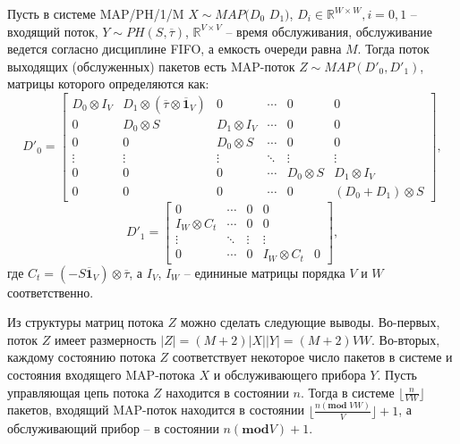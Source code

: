 \begin{thm}\label{th:ch4_map_departure}\textnormal{\cite{VishnevskyDudin2018}}
    Пусть в системе MAP/PH/1/M $X \sim MAP(D_{0}$ $D_{1})$, $D_i \in \mathbb{R}^{W \times W}, i=0,1$ -- входящий поток, $Y \sim PH(S, \overline{\tau})$, $\mathbb{R}^{V \times V}$ -- время обслуживания, обслуживание ведется согласно дисциплине FIFO, а емкость очереди равна $M$. Тогда поток выходящих (обслуженных) пакетов есть MAP-поток $Z \sim MAP(D'_{0},D'_{1})$, матрицы которого определяются как:
    \begin{equation}
        \label{eq:ch4_qs_departure_d0}
        D'_{0} =
        \begin{bmatrix}
            D_{0} \otimes I_{V} & D_{1}\otimes (\overline{\tau} \otimes \overline{\mathbf{1}}_{V}) & 0 & \cdots & 0 & 0\\
            0 & D_{0} \otimes S & D_{1} \otimes I_{V} & \cdots & 0 & 0\\
            0 & 0 & D_{0} \otimes S & \cdots & 0 & 0 \\
            \vdots & \vdots & \vdots & \ddots & \vdots & \vdots \\
            0 & 0 & 0 & \cdots & D_{0} \otimes S & D_{1} \otimes I_{V}\\
            0 & 0 & 0 & \cdots & 0 & (D_{0}+D_{1}) \otimes S
        \end{bmatrix},
    \end{equation}
    \begin{equation}
        \label{eq:ch4_qs_departure_d1}
        D'_{1} =
          \begin{bmatrix}
              0 & \cdots & 0 & 0 \\
              I_{W} \otimes C_{t} & \cdots & 0 & 0 \\
              \vdots & \ddots & \vdots & \vdots \\
              0 & \cdots & 0 & I_{W} \otimes C_{t} & 0
          \end{bmatrix},
    \end{equation}
    где $C_{t} = (-S \overline{\mathbf{1}}_{V}) \otimes \overline{\tau}$, а $I_V$, $I_W$ -- едининые матрицы порядка $V$ и $W$ соответственно.
\end{thm}

Из структуры матриц потока $Z$ можно сделать следующие выводы. Во-первых, поток $Z$ имеет размерность $|Z| = (M+2)|X| |Y| = (M+2) V W$. Во-вторых, каждому состоянию потока $Z$ соответствует некоторое число пакетов в системе и состояния входящего MAP-потока $X$ и обслуживающего прибора $Y$. Пусть управляющая цепь потока $Z$ находится в состоянии $n$. Тогда в системе $\lfloor \frac{n}{VW} \rfloor$ пакетов, входящий MAP-поток находится в состоянии $\lfloor \frac{n (\mathbf{mod}\;VW)}{V} \rfloor + 1$, а обслуживающий прибор -- в состоянии $n(\mathbf{mod} V)+1$.

